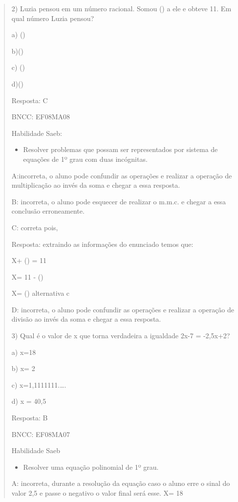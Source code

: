 \begin{quote}
\begin{escolha}
2) Luzia pensou em um número racional. Somou () a ele e
obteve 11. Em qual número Luzia pensou?

a) ()

b)()

c) ()

d)()

Resposta: C

BNCC: EF08MA08

Habilidade Saeb:

\begin{itemize}
\tightlist
\item
  Resolver problemas que possam ser representados por sistema de
  equações de 1º grau com duas incógnitas.
\end{itemize}

A:incorreta, o aluno pode confundir as operações e realizar a operação
de multiplicação ao invés da soma e chegar a essa resposta.

B: incorreta, o aluno pode esquecer de realizar o m.m.c. e chegar a essa
conclusão erroneamente.

C: correta pois,

Resposta: extraindo as informações do enunciado temos que:

X+ () = 11

X= 11 - ()

X= () alternativa c

D: incorreta, o aluno pode confundir as operações e realizar a operação
de divisão ao invés da soma e chegar a essa resposta.

3) Qual é o valor de x que torna verdadeira a igualdade 2x-7 = -2,5x+2?

a) x=18

b) x= 2

c) x=1,1111111.\ldots.

d) x = 40,5

Resposta: B

BNCC: EF08MA07

Habilidade Saeb

\begin{itemize}
\tightlist
\item
  Resolver uma equação polinomial de 1º grau.
\end{itemize}

A: incorreta, durante a resolução da equação caso o aluno erre o sinal
do valor 2,5 e passe o negativo o valor final será esse. X= 18


\end{escolha}
\end{quote}
